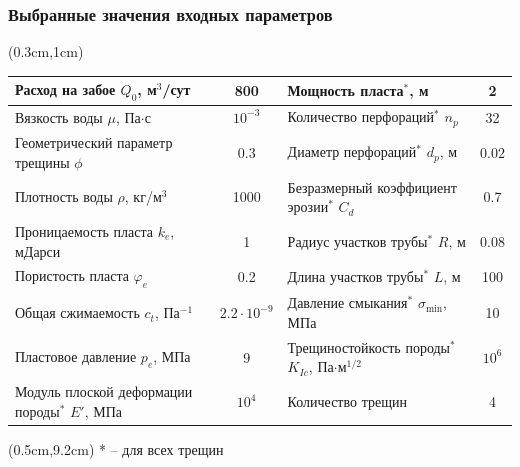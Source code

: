 \documentclass{beamer}
\begin{document}
\begin{frame}
\frametitle{Выбранные значения входных параметров}

\begin{textblock*}{6cm}(0.3cm,1cm)
\renewcommand{\arraystretch}{1.2}

\small
\begin{center}
\begin{tabular}{|p{4cm}|c|p{4.3cm}|c|}
\hline
Расход на забое $Q_0$, м$^3$/сут & 800 & Мощность пласта$^{*}$, м & 2 \\
\hline
Вязкость воды $\mu$, Па$\cdot$с & $10^{-3}$ & Количество перфораций$^{*}$ $n_p$ & 32 \\
\hline
Геометрический параметр трещины $\phi$ & 0.3 & Диаметр перфораций$^{*}$ $d_p$, м & $0.02$ \\
\hline
Плотность воды $\rho$, кг/м$^3$ & 1000 & Безразмерный коэффициент эрозии$^{*}$ $C_d$ & 0.7 \\
\hline
Проницаемость пласта $k_e$, мДарси & 1 & Радиус участков трубы$^{*}$ $R$, м & 0.08 \\
\hline
Пористость пласта $\varphi_e$ & 0.2 & Длина участков трубы$^{*}$ $L$, м & 100 \\
\hline
Общая сжимаемость $c_t$, Па$^{-1}$ & $2.2\cdot10^{-9}$ & Давление смыкания$^{*}$ $\sigma_{\text{min}}$, МПа & 10 \\
\hline
Пластовое давление $p_e$, МПа & 9 & Трещиностойкость породы$^{*}$ $K_{Ic}$, Па$\cdot\text{м}^{1/2}$ & $10^6$ \\
\hline
Модуль плоской деформации породы$^{*}$ $E'$, МПа & $10^4$ & Количество трещин & 4 \\
\hline
\end{tabular}
\end{center}
\end{textblock*}

\begin{textblock*}{6cm}(0.5cm,9.2cm)
\scriptsize
\textcolor{lit_gray}{* -- для всех трещин}
\end{textblock*}

\normalsize

\end{frame}
\end{document}
